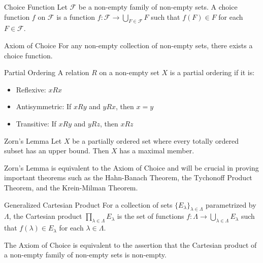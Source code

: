 \begin{definitionbox}{Choice Function}
Let $\mathcal{F}$ be a non-empty family of non-empty sets. A choice function $f$ on $\mathcal{F}$ is a function $f: \mathcal{F} \to \bigcup_{F\in\mathcal{F}}F$ such that $f(F) \in F$ for each $F \in \mathcal{F}$.
\end{definitionbox}

\begin{theorembox}{Axiom of Choice}
For any non-empty collection of non-empty sets, there exists a choice function.
\end{theorembox}

\begin{definitionbox}{Partial Ordering}
A relation $R$ on a non-empty set $X$ is a partial ordering if it is:
\begin{itemize}
    \item Reflexive: $x R x$
    \item Antisymmetric: If $xRy$ and $yRx$, then $x = y$
    \item Transitive: If $xRy$ and $yRz$, then $xRz$
\end{itemize}
\end{definitionbox}

\begin{theorembox}{Zorn's Lemma}
Let $X$ be a partially ordered set where every totally ordered subset has an upper bound. Then $X$ has a maximal member.
\end{theorembox}

\begin{note}
Zorn's Lemma is equivalent to the Axiom of Choice and will be crucial in proving important theorems such as the Hahn-Banach Theorem, the Tychonoff Product Theorem, and the Krein-Milman Theorem.
\end{note}

\begin{definitionbox}{Generalized Cartesian Product}
For a collection of sets $\{E_{\lambda}\}_{\lambda\in\Lambda}$ parametrized by $\Lambda$, the Cartesian product $\prod_{\lambda\in\Lambda}E_{\lambda}$ is the set of functions $f: \Lambda \to \bigcup_{\lambda\in\Lambda}E_{\lambda}$ such that $f(\lambda) \in E_{\lambda}$ for each $\lambda \in \Lambda$.
\end{definitionbox}

\begin{note}
The Axiom of Choice is equivalent to the assertion that the Cartesian product of a non-empty family of non-empty sets is non-empty.
\end{note}
